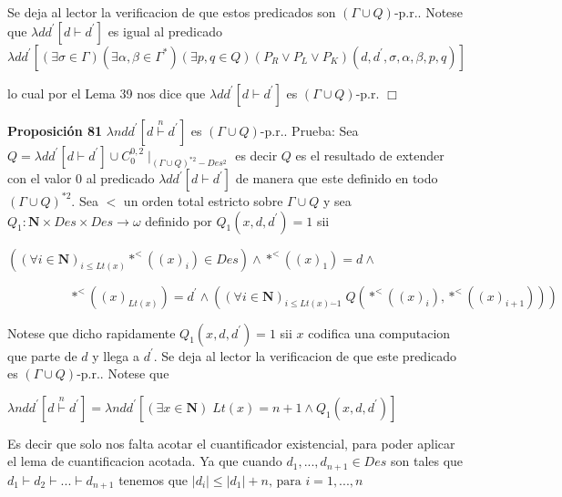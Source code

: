 Se deja al lector la verificacion de que estos predicados son \((\Gamma \cup Q)\)-p.r.. Notese que \(\lambda dd^{\prime }\left[ d\vdash d^{\prime }\right] \) es igual al predicado
\(\displaystyle \lambda dd^{\prime }\left[ (\exists \sigma \in \Gamma )(\exists \alpha ,\beta \in \Gamma ^{\ast })(\exists p,q\in Q)(P_{R}\vee P_{L}\vee P_{K})(d,d^{\prime },\sigma ,\alpha ,\beta ,p,q)\right] \)

lo cual por el Lema 39 nos dice que \(\lambda dd^{\prime } \left[ d\vdash d^{\prime }\right] \) es \((\Gamma \cup Q)\)-p.r. \(\Box\)





\textbf{Proposición 81} \(\lambda ndd^{\prime }\left[ d\overset{n}{\vdash }d^{\prime }\right] \) es \( (\Gamma \cup Q)\)-p.r..
Prueba: Sea \(Q=\lambda dd^{\prime }\left[ d\vdash d^{\prime }\right] \cup C_{0}^{0,2}\mid _{(\Gamma \cup Q)^{\ast 2}-Des^{2}}\) es decir \(Q\) es el resultado de extender con el valor \(0\) al predicado \(\lambda dd^{\prime } \left[ d\vdash d^{\prime }\right] \) de manera que este definido en todo \( (\Gamma \cup Q)^{\ast 2}\). Sea \(< \) un orden total estricto sobre \(\Gamma \cup Q\) y sea \(Q_{1}:\mathbf{N}\times Des\times Des\rightarrow \omega \) definido por \(Q_{1}(x,d,d^{\prime })=1\) sii

\(\left( (\forall i\in \mathbf{N})_{i\leq Lt(x)}\ast ^{< }((x)_{i})\in Des\right) \wedge \ast ^{< }((x)_{1})=d\wedge \)

\(\ \ \ \ \ \ \ \ \ \ \ \ \ \ \ \ \ \ \ \ \ \ \ast ^{< }((x)_{Lt(x)})=d^{\prime }\wedge \left( (\forall i\in \mathbf{N})_{i\leq Lt(x)\dot{-}1}\;Q(\ast ^{< }((x)_{i}),\ast ^{< }((x)_{i+1}))\right) \)

Notese que dicho rapidamente \(Q_{1}(x,d,d^{\prime })=1\) sii \(x\) codifica una computacion que parte de \(d\) y llega a \(d^{\prime }\). Se deja al lector la verificacion de que este predicado es \((\Gamma \cup Q)\)-p.r.. Notese que

\(\displaystyle \lambda ndd^{\prime }\left[ d\overset{n}{\vdash }d^{\prime }\right] =\lambda ndd^{\prime }\left[ \left( \exists x\in \mathbf{N}\right) \;Lt(x)=n+1\wedge Q_{1}(x,d,d^{\prime })\right] \)

Es decir que solo nos falta acotar el cuantificador existencial, para poder aplicar el lema de cuantificacion acotada. Ya que cuando \( d_{1},...,d_{n+1}\in Des\) son tales que \(d_{1}\vdash d_{2}\vdash ...\vdash d_{n+1}\) tenemos que
\(\displaystyle \left\vert d_{i}\right\vert \leq \left\vert d_{1}\right\vert +n\text{, para } i=1,...,n \)

